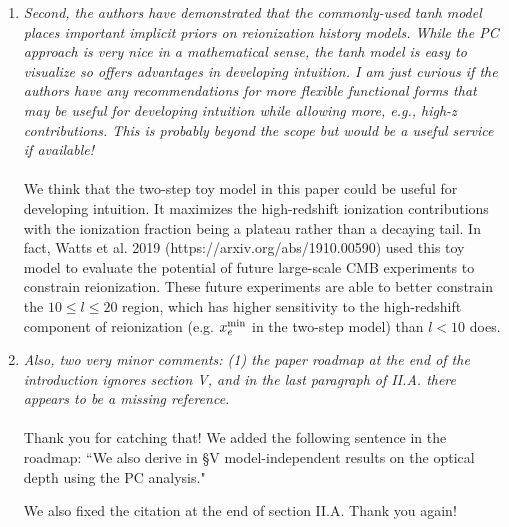 \documentclass[10pt]{article}
\begin{document}
\begin{enumerate}
    \item{
        \textit{Second, the authors have demonstrated that the commonly-used tanh model places important implicit priors on reionization history models. While the PC approach is very nice in a mathematical sense, the tanh model is easy to visualize so offers advantages in developing intuition. I am just curious if the authors have any recommendations for more flexible functional forms that may be useful for developing intuition while allowing more, e.g., high-z contributions. This is probably beyond the scope but would be a useful service if available!
        }\\
        \\
        We think that the two-step toy model in this paper could be useful for developing intuition. It maximizes the high-redshift ionization contributions with the ionization fraction being a plateau rather than a decaying tail. In fact, Watts et al. 2019 (https://arxiv.org/abs/1910.00590) used this toy model to evaluate the potential of future large-scale CMB experiments to constrain reionization. These future experiments are able to better constrain the $10\leq l\leq20$ region, which has higher sensitivity to the high-redshift component of reionization (e.g. $x_e^{\rm min}$ in the two-step model) than $l<10$ does.
        }
        
    \item{
        \textit{
        Also, two very minor comments: (1) the paper roadmap at the end of the introduction ignores section V, and in the last paragraph of II.A. there appears to be a missing reference.
        }\\
        \\
        Thank you for catching that! We added the following sentence in the roadmap: ``We also derive in \S V model-independent results on the optical depth using the PC analysis."
        
        We also fixed the citation at the end of section II.A. Thank you again!
        }
    

\end{enumerate}
\end{document}
